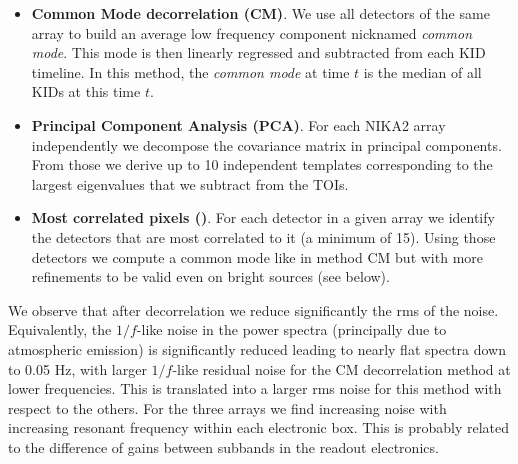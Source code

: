 \begin{itemize}
\item {\bf Common Mode decorrelation (CM)}. We use all detectors of the same
  array to build an average low frequency component nicknamed \emph{common
    mode}. This mode is then linearly regressed and subtracted from each KID
  timeline. In this method, the \emph{common mode} at time $t$ is the median of
  all KIDs at this time $t$.

\item {\bf Principal Component Analysis (PCA)}. For each NIKA2 array
  independently we decompose the covariance matrix in principal components. From
  those we derive up to 10 independent templates corresponding to the largest
  eigenvalues that we subtract from the TOIs.

\item {\bf Most correlated pixels (\cmoneb)}. For each detector in a given array we
  identify the detectors that are most correlated to it (a minimum of
  15). Using those detectors we compute a common mode like in method CM but with
  more refinements to be valid even on bright sources (see below).
\end{itemize}

 We observe that after decorrelation we reduce significantly the rms of the
noise. Equivalently, the $1/f$-like noise in the power spectra
(principally due to atmospheric emission)
is significantly reduced leading to nearly flat spectra down to 0.05 Hz, with
larger $1/f$-like residual noise for the CM decorrelation method at lower
frequencies. This is translated into a larger rms noise for this method with
respect to the others. For the three arrays we find increasing noise with
increasing resonant frequency within each electronic box. This is probably
related to the difference of gains between subbands in the readout
electronics. %


